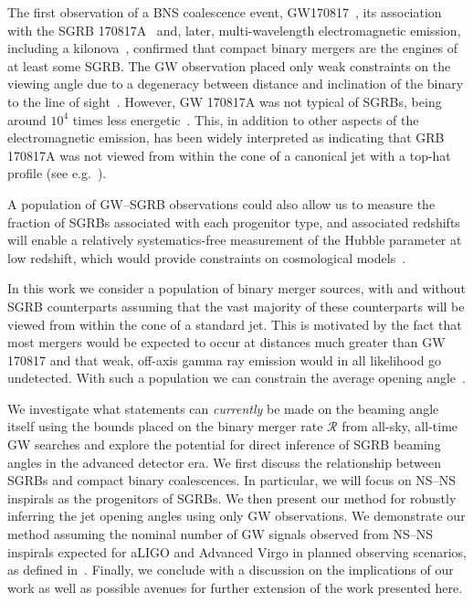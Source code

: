 \documentclass[twocolumn,nofootinbib]{revtex4-1}
\newcommand{\cbcrate}{{{\mathcal R}}}
\newcommand{\BNS}{\ac{NS}--\ac{NS}\xspace}
\newcommand{\JOINT}{\ac{GW}--\ac{SGRB}\xspace}
\begin{document}
The first observation of a \ac{BNS} coalescence event,
GW170817~\cite{TheLIGOScientific:2017qsa}, its association with the
\ac{SGRB} 170817A~\cite{Monitor:2017mdv,Goldstein:2017mmi,Savchenko:2017ffs}
and, later, multi-wavelength electromagnetic emission, including a
kilonova~\cite{2017ApJ...848L..12A}, confirmed that compact binary mergers are
the engines of at least some \ac{SGRB}. The \ac{GW} observation placed only
weak constraints on the viewing angle due to a degeneracy between distance and
inclination of the binary to the line of sight~\cite{TheLIGOScientific:2017qsa}.
However, GW 170817A was not typical of \acp{SGRB}, being around $10^{4}$ times
less energetic~\cite{Goldstein:2017mmi}. This, in addition to other aspects of
the electromagnetic emission, has been widely interpreted as indicating that
GRB 170817A was not viewed from within the cone of a canonical jet with a
top-hat profile (see
e.g.~\cite{Fong:2017ekk,Kasliwal:2017ngb,Gottlieb:2017pju,Haggard:2017qne}).

A population of \JOINT observations could also allow us to measure the fraction
of \acp{SGRB} associated with each progenitor type, and associated redshifts
will enable a relatively systematics-free measurement of the Hubble parameter
at low redshift, which would provide constraints on cosmological
models~\cite{Schutz:1986gp,Nissanke:2009kt,Chen:2012qh,Abbott:2017xzu}.

In this work we consider a population of binary merger sources, with and without
\ac{SGRB} counterparts assuming that the vast majority of these counterparts
will be viewed from within the cone of a standard jet. This is motivated by the
fact that most mergers would be expected to occur at distances much greater than
GW 170817 and that weak, off-axis gamma ray emission would in all likelihood go
undetected. With such a population we can constrain the average opening
angle~\cite{Chen:2012qh,Clark:2014jpa,Abbott:2016ymx}.

We investigate what statements can \emph{currently} be made on the beaming angle
itself using the bounds placed on the binary merger rate $\cbcrate$ from
all-sky, all-time \ac{GW} searches and explore the potential for direct
inference of \ac{SGRB} beaming angles in the advanced detector era.
We first discuss the relationship between \acp{SGRB} and compact binary
coalescences. In particular, we will focus on \BNS inspirals as the progenitors
of \acp{SGRB}. We then present our method for robustly inferring the jet opening
angles using only \ac{GW} observations. We demonstrate our method assuming the
nominal number of \ac{GW} signals observed from \BNS inspirals expected for
\ac{aLIGO} and Advanced Virgo in planned observing scenarios, as defined
in~\cite{Aasi:2013wya}. Finally, we conclude with a discussion on the
implications of our work as well as possible avenues for further extension of
the work presented here.
\end{document}
